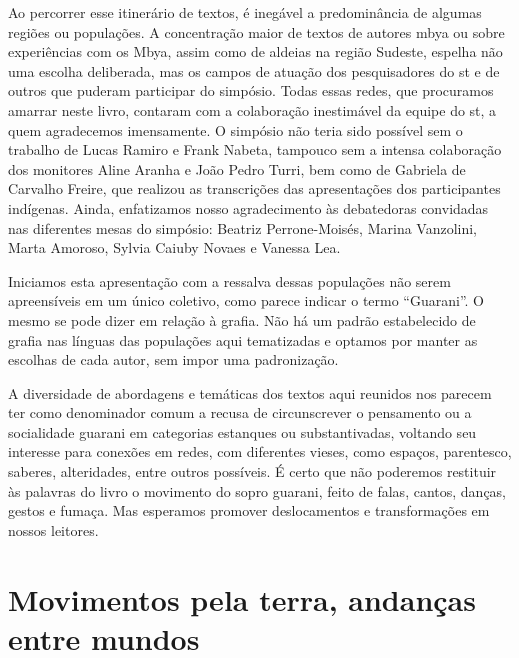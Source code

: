 Ao percorrer esse itinerário de textos, é inegável a predominância de
algumas regiões ou populações. A concentração maior de textos de
autores mbya ou sobre experiências com os Mbya, assim como de aldeias
na região Sudeste, espelha não uma escolha deliberada, mas os campos de
atuação dos pesquisadores do st e de outros que puderam participar
do simpósio. Todas essas redes, que procuramos amarrar neste livro,
contaram com a colaboração inestimável da equipe do st, a quem
agradecemos imensamente. O simpósio não teria sido possível sem o
trabalho de Lucas Ramiro e Frank Nabeta, tampouco sem a intensa
colaboração dos monitores Aline Aranha e João Pedro Turri, bem como de
Gabriela de Carvalho Freire, que realizou as transcrições das
apresentações dos participantes indígenas. Ainda, enfatizamos nosso
agradecimento às debatedoras convidadas nas diferentes mesas do
simpósio: Beatriz Perrone-Moisés, Marina Vanzolini, Marta Amoroso,
Sylvia Caiuby Novaes e Vanessa Lea.

Iniciamos esta apresentação com a ressalva dessas populações não serem
apreensíveis em um único coletivo, como parece indicar o termo ``Guarani''.
O mesmo se pode dizer em relação à grafia. Não há um padrão
estabelecido de grafia nas línguas das populações aqui tematizadas e
optamos por manter as escolhas de cada autor, sem impor uma
padronização. 

A diversidade de abordagens e temáticas dos textos aqui reunidos nos
parecem ter como denominador comum a recusa de circunscrever o
pensamento ou a socialidade guarani em categorias estanques ou
substantivadas, voltando seu interesse para conexões em redes, com
diferentes vieses, como espaços, parentesco, saberes, alteridades,
entre outros possíveis. É certo que não poderemos restituir às palavras
do livro o movimento do sopro guarani, feito de falas, cantos, danças,
gestos e fumaça. Mas esperamos promover deslocamentos e transformações
em nossos leitores. 

\part{Movimentos pela terra, andanças entre mundos}

